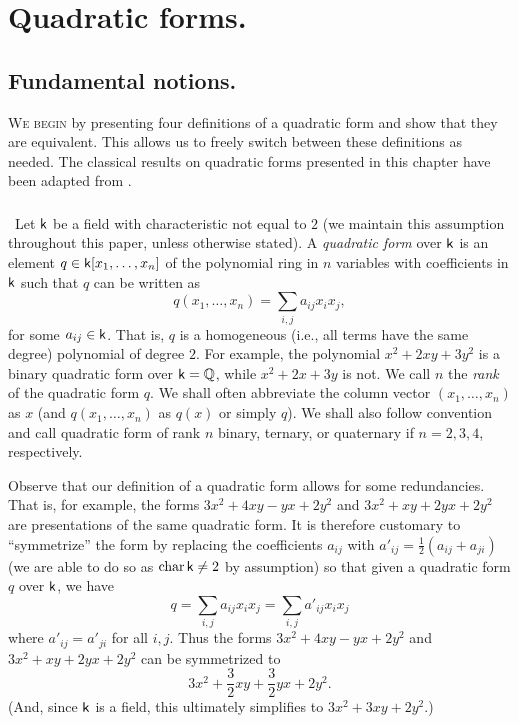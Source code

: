 \chapter{Quadratic forms.}
\label{chap:quadratic-forms}

\section{Fundamental notions.}

{\scshape We begin} by presenting four definitions of a quadratic form and show
that they are equivalent. This allows us to freely switch between these
definitions as needed. The classical results on quadratic forms presented in
this chapter have been adapted from
\cite{clarkquadratic,lam1973quadratic,ormsbynotes,szymiczek2017bilinear}.

\subsection{}\label{sec:quadratic-forms}~Let \(\mathsf{k}\) be a field with
characteristic not equal to \(2\) (we maintain this assumption throughout this
paper, unless otherwise stated). A \emph{quadratic form} over \(\mathsf{k}\) is an
element \(q \in \mathsf{k}[x_1, \dots, x_n]\) of the polynomial ring in \(n\)
variables with coefficients in \(\mathsf{k}\) such that \(q\) can be written as
\[
  q(x_1, \dots, x_n) = \sum_{i, j} a_{ij}x_ix_j,
\]
for some \(a_{ij} \in \mathsf{k}\). That is, \(q\) is a homogeneous (i.e., all terms
have the same degree) polynomial of degree \(2\). For example, the polynomial
\(x^2 + 2xy + 3y^2\) is a binary quadratic form over \(\mathsf{k} = \mathbb{Q}\),
while \(x^2 + 2x + 3y\) is not. We call \(n\) the \emph{rank} of the quadratic
form \(q\). We shall often abbreviate the column vector \((x_1, \dots, x_n)\) as
\(x\) (and \(q(x_1, \dots, x_n)\) as \(q(x)\) or simply \(q\)). We shall also
follow convention and call quadratic form of rank \(n\) binary, ternary, or
quaternary if \(n = 2, 3, 4\), respectively.

Observe that our definition of a quadratic form allows for some redundancies.
That is, for example, the forms \(3x^2 + 4xy - yx + 2y^2\) and \(3x^2 + xy + 2yx
+ 2y^2\) are presentations of the same quadratic form. It is therefore customary
to ``symmetrize'' the form \cite{lam1973quadratic} by replacing the coefficients
\(a_{ij}\) with \(a'_{ij} = \frac{1}{2}(a_{ij} + a_{ji})\) (we are able to do so
as \(\operatorname{char} \mathsf{k} \neq 2\) by assumption) so that given a quadratic form \(q\)
over \(\mathsf{k}\), we have
\[
  q = \sum_{i, j} a_{ij} x_i x_j = \sum_{i, j} a'_{ij} x_i x_j
\]
where \(a'_{ij} = a'_{ji}\) for all \(i, j\). Thus the forms \(3x^2 + 4xy - yx +
2y^2\) and \(3x^2 + xy + 2yx + 2y^2\) can be symmetrized to \[3x^2
+\frac{3}{2}xy + \frac{3}{2}yx + 2y^2.\] (And, since \(\mathsf{k}\) is a field, this
ultimately simplifies to \(3x^2 + 3xy + 2y^2\).)

